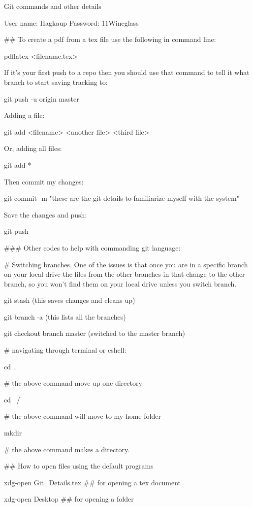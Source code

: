 Git commands and other details

User name: Hagkaup
Password: 11Wineglass


## To create a pdf from a tex file use the following in command line:

pdflatex <filename.tex>



If it’s your first push to a repo then you should use that command to tell it what branch to start saving tracking to:

git push -u origin master


Adding a file:

git add <filename> <another file> <third file>

Or, adding all files:

git add *

Then commit my changes:

git commit -m "these are the git details to familiarize myself with the system"

Save the changes and push:

git push

### Other codes to help with commanding git language:

# Switching branches. One of the issues is that once you are in a specific branch on your local drive the files from the other branches in that change to the other branch, so you won't find them on your local drive unless you switch branch.

git stash (this saves changes and cleans up)

git branch -a (this lists all the branches)

git checkout branch master (switched to the master branch)




# navigating through terminal or eshell:

cd ..

# the above command move up one directory

cd ~/

# the above command will move to my home folder

mkdir

# the above command makes a directory.

## How to open files using the default programs

xdg-open Git_Details.tex ## for opening a tex document

xdg-open Desktop ## for opening a folder




